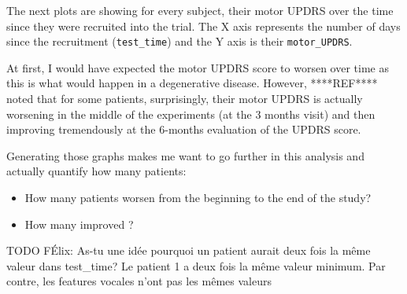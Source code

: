 \documentclass[11pt]{article}
\providecommand{\tightlist}{%
      \setlength{\itemsep}{0pt}\setlength{\parskip}{0pt}}
\begin{document}
    The next plots are showing for every subject, their motor UPDRS over the
time since they were recruited into the trial. The X axis represents the
number of days since the recruitment (\texttt{test\_time}) and the Y
axis is their \texttt{motor\_UPDRS}.

At first, I would have expected the motor UPDRS score to worsen over
time as this is what would happen in a degenerative disease. However,
****REF**** noted that for some patients, surprisingly, their motor
UPDRS is actually worsening in the middle of the experiments (at the 3
months visit) and then improving tremendously at the 6-months evaluation
of the UPDRS score.

Generating those graphs makes me want to go further in this analysis and
actually quantify how many patients:

\begin{itemize}
\tightlist
\item
  How many patients worsen from the beginning to the end of the study?
\item
  How many improved ?
\end{itemize}

    TODO FÉlix: As-tu une idée pourquoi un patient aurait deux fois la même
valeur dans test\_time? Le patient 1 a deux fois la même valeur minimum.
Par contre, les features vocales n'ont pas les mêmes valeurs
\end{document}
